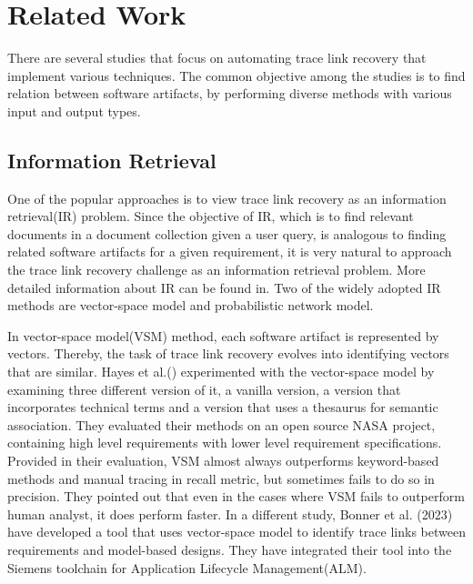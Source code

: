 \section{Related Work}
\label{sec:relwork}

There are several studies that focus on automating trace link recovery that implement various techniques. The common objective among the studies is to find relation between software artifacts, by performing diverse methods with various input and output types.

\subsection{Information Retrieval}

One of the popular approaches is to view trace link recovery as an information retrieval(IR) problem. Since the objective of IR, which is to find relevant documents in a document collection given a user query, is analogous to finding related software artifacts for a given requirement, it is very natural to approach the trace link recovery challenge as an information retrieval problem. More detailed information about IR can be found in\cite{IR}. Two of the widely adopted IR methods are vector-space model and probabilistic network model.


In vector-space model(VSM) method, each software artifact is represented by vectors. Thereby, the task of trace link recovery evolves into identifying vectors that are similar. Hayes et al.()\cite{hayes-2003} experimented with the vector-space model by examining three different version of it, a vanilla version, a version that incorporates technical terms and a version that uses a thesaurus for semantic association. They evaluated their methods on an open source NASA project, containing high level requirements with lower level requirement specifications. Provided in their evaluation, VSM almost always outperforms keyword-based methods and manual tracing in recall metric, but sometimes fails to do so in precision. They pointed out that even in the cases where VSM fails to outperform human analyst, it does perform faster. In a different study, Bonner et al. (2023)\cite{bonner-2023} have developed a tool that uses vector-space model to identify trace links between requirements and model-based designs. They have integrated their tool into the Siemens toolchain for Application Lifecycle Management(ALM).


